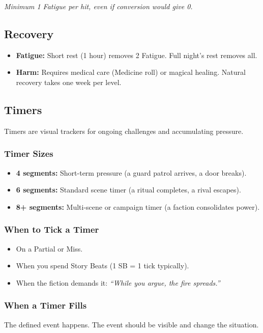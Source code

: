 \documentclass[11pt]{book}
\begin{document}
\textit{Minimum 1 Fatigue per hit, even if conversion would give 0.}

\subsection*{Recovery}
\begin{itemize}
  \item \textbf{Fatigue:} Short rest (1 hour) removes 2 Fatigue. Full night's rest removes all.
  \item \textbf{Harm:} Requires medical care (Medicine roll) or magical healing. Natural recovery takes one week per level.
\end{itemize}

\subsection*{Timers}

Timers are visual trackers for ongoing challenges and accumulating pressure.

\subsubsection*{Timer Sizes}
\begin{itemize}
  \item \textbf{4 segments:} Short-term pressure (a guard patrol arrives, a door breaks).
  \item \textbf{6 segments:} Standard scene timer (a ritual completes, a rival escapes).
  \item \textbf{8+ segments:} Multi-scene or campaign timer (a faction consolidates power).
\end{itemize}

\subsubsection*{When to Tick a Timer}
\begin{itemize}
  \item On a Partial or Miss.
  \item When you spend Story Beats (1 SB = 1 tick typically).
  \item When the fiction demands it: \textit{``While you argue, the fire spreads.''}
\end{itemize}

\subsubsection*{When a Timer Fills}
The defined event happens. The event should be visible and change the situation.
\end{document}
